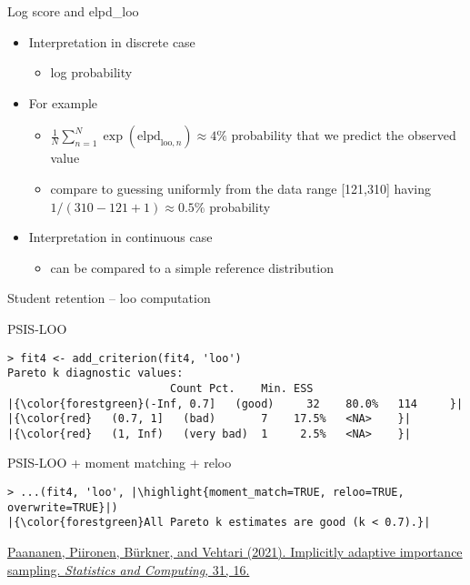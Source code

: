 \documentclass[english,t]{beamer}
\newcommand{\reducedstrut}{\vrule width 0pt height .9\ht\strutbox depth .9\dp\strutbox\relax}
\newcommand{\highlight}[1]{%
  \begingroup
  \setlength{\fboxsep}{0pt}%
  \colorbox{yellow!30}{\reducedstrut\detokenize{#1}\/}%
  \endgroup
}
\begin{document}
\begin{frame}{Log score and elpd\_loo}

  \begin{itemize}
  \item Interpretation in discrete case
    \begin{itemize}
    \item log probability
    \end{itemize}
  \item<2-> For example
    \begin{itemize}
    \item $\frac{1}{N}\sum_{n=1}^N\exp(\mathrm{elpd}_{\mathrm{loo},n}) \approx 4\%$ probability that we predict the
      observed value
    \item<3-> compare to guessing uniformly from the data range [121,310] having
      $1/(310-121+1) \approx 0.5\%$ probability 
    \end{itemize}
  \item<5-> Interpretation in continuous case
    \begin{itemize}
    \item can be compared to a simple reference distribution
    \end{itemize}
  \end{itemize}

\end{frame}

\begin{frame}[fragile]{Student retention -- loo computation}

PSIS-LOO

\begin{verbatim}
> fit4 <- add_criterion(fit4, 'loo')
Pareto k diagnostic values:
                         Count Pct.    Min. ESS
|{\color{forestgreen}(-Inf, 0.7]   (good)     32    80.0%   114     }|
|{\color{red}   (0.7, 1]   (bad)       7    17.5%   <NA>    }|
|{\color{red}   (1, Inf)   (very bad)  1     2.5%   <NA>    }|
\end{verbatim}

\pause
PSIS-LOO + moment matching + reloo
\begin{verbatim}
> ...(fit4, 'loo', |\highlight{moment_match=TRUE, reloo=TRUE, overwrite=TRUE}|)
|{\color{forestgreen}All Pareto k estimates are good (k < 0.7).}|
\end{verbatim}

  \vfill
{\color{gray}\footnotesize\href{https://doi.org/10.1007/s11222-020-09982-2}{Paananen, Piironen, Bürkner, and Vehtari (2021). Implicitly adaptive importance sampling. \textit{Statistics and Computing}, 31, 16.}}
  
\end{frame}
\end{document}

